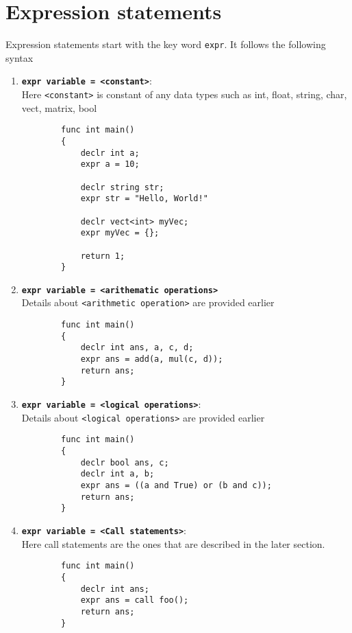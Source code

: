 \documentclass[journal, 18pt]{report}
\begin{document}
\section{Expression statements}
Expression statements start with the key word \texttt{expr}. It follows the following syntax\\
\begin{enumerate}
    \item \textbf{\texttt{expr variable = <constant>}}:\\
    Here \texttt{<constant>} is constant of any data types such as int, float,
    string, char, vect, matrix, bool
    \begin{lstlisting}
        func int main()
        {
            declr int a;
            expr a = 10;

            declr string str;
            expr str = "Hello, World!"

            declr vect<int> myVec;
            expr myVec = {};

            return 1;
        }
    \end{lstlisting}
    \item \textbf{\texttt{expr variable = <arithematic operations>}} \\
    Details about \texttt{<arithmetic operation>} are provided earlier
    \begin{lstlisting}
        func int main()
        {
            declr int ans, a, c, d;
            expr ans = add(a, mul(c, d));
            return ans;
        }
    \end{lstlisting}
    \item \textbf{\texttt{expr variable = <logical operations>}}:\\
    Details about \texttt{<logical operations>} are provided earlier
    \begin{lstlisting}
        func int main()
        {
            declr bool ans, c;
            declr int a, b;
            expr ans = ((a and True) or (b and c));
            return ans;
        }
    \end{lstlisting}
    \item \textbf{\texttt{expr variable = <Call statements>}}:\\
    Here call statements are the ones that are described in the later section.
    \begin{lstlisting}
        func int main()
        {
            declr int ans;
            expr ans = call foo();
            return ans;
        }
    \end{lstlisting}
\end{enumerate}
\end{document}
